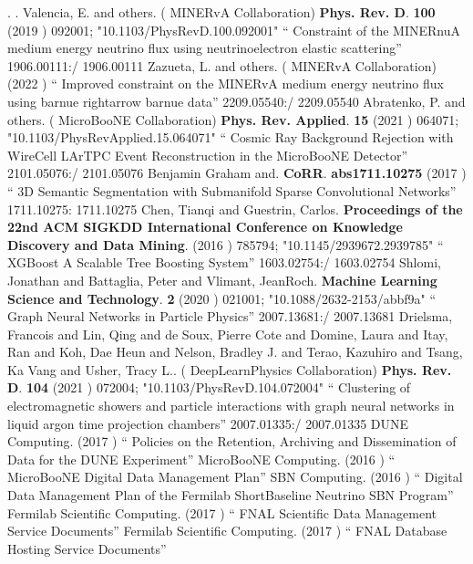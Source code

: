 \documentclass{article}
\begin{document}
\begin{thebibliography}{99}
 . 
 . 
  Valencia, E. and others. ( MINERvA Collaboration) {\bf  Phys. Rev. D}. {\bf  100} (2019 )  092001;  "10.1103/PhysRevD.100.092001" `` Constraint of the MINERnuA medium energy neutrino flux using neutrinoelectron elastic scattering'' 1906.00111:/ 1906.00111
  Zazueta, L. and others. ( MINERvA Collaboration) (2022 ) `` Improved constraint on the MINERvA medium energy neutrino flux using barnue rightarrow barnue data'' 2209.05540:/ 2209.05540
  Abratenko, P. and others. ( MicroBooNE Collaboration) {\bf  Phys. Rev. Applied}. {\bf  15} (2021 )  064071;  "10.1103/PhysRevApplied.15.064071" `` Cosmic Ray Background Rejection with WireCell LArTPC Event Reconstruction in the MicroBooNE Detector'' 2101.05076:/ 2101.05076
  Benjamin Graham and. {\bf  CoRR}. {\bf  abs1711.10275} (2017 ) `` 3D Semantic Segmentation with Submanifold Sparse Convolutional Networks'' 1711.10275: 1711.10275
  Chen, Tianqi and Guestrin, Carlos. {\bf  Proceedings of the 22nd ACM SIGKDD International Conference on Knowledge Discovery and Data Mining}. (2016 )  785794;  "10.1145/2939672.2939785" `` XGBoost A Scalable Tree Boosting System'' 1603.02754:/ 1603.02754
  Shlomi, Jonathan and Battaglia, Peter and Vlimant, JeanRoch. {\bf  Machine Learning Science and Technology}. {\bf  2} (2020 )  021001;  "10.1088/2632-2153/abbf9a" `` Graph Neural Networks in Particle Physics'' 2007.13681:/ 2007.13681
  Drielsma, Francois and Lin, Qing and de Soux, Pierre Cote and Domine, Laura and Itay, Ran and Koh, Dae Heun and Nelson, Bradley J. and Terao, Kazuhiro and Tsang, Ka Vang and Usher, Tracy L.. ( DeepLearnPhysics Collaboration) {\bf  Phys. Rev. D}. {\bf  104} (2021 )  072004;  "10.1103/PhysRevD.104.072004" `` Clustering of electromagnetic showers and particle interactions with graph neural networks in liquid argon time projection chambers'' 2007.01335:/ 2007.01335
   DUNE Computing. (2017 ) ``  Policies on the Retention, Archiving and Dissemination of Data for the DUNE Experiment''
   MicroBooNE Computing. (2016 ) ``  MicroBooNE Digital Data Management Plan''
   SBN Computing. (2016 ) ``  Digital Data Management Plan of the Fermilab ShortBaseline Neutrino SBN Program''
   Fermilab Scientific Computing. (2017 ) ``  FNAL Scientific Data Management Service Documents''
   Fermilab Scientific Computing. (2017 ) ``  FNAL Database Hosting Service Documents''

\end{thebibliography}
\end{document}

